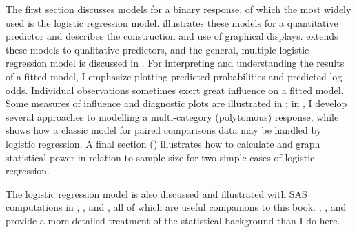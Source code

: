 The first section discusses models for a binary response, of which the most
widely used is the logistic regression model.
 illustrates these models for
a quantitative predictor and 
describes the construction and use of graphical displays.
 extends these models to qualitative predictors,
and the general, multiple logistic regression model is discussed in .
For interpreting and understanding the results of a fitted model,
I emphasize plotting predicted probabilities and predicted log odds.
Individual observations sometimes exert great influence on a fitted model.
Some measures of influence and diagnostic plots are illustrated in
;
in , I develop several approaches to
modelling a multi-category (polytomous) response,
while  shows how a classic model for
paired comparisons data may be handled by logistic regression.
A final section ()
illustrates how to calculate and graph statistical power in relation
to sample size for two simple cases of logistic regression.

The logistic regression model is also discussed and illustrated with
SAS computations in \LRE,
\citet[--9]{Stokes-etal:95},
\citet{Allison:99} and \citet[]{Zelterman:99},
all of which are useful companions to this book.
\citet{Agresti:90}, \citet{Collett:91}, and \citet{Fox:97} provide a more detailed treatment
of the statistical background than I do here.














